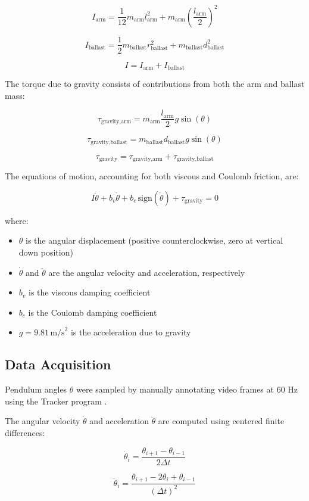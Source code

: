 \[
I_{\text{arm}} = \frac{1}{12} m_{\text{arm}} l_{\text{arm}}^2 + m_{\text{arm}} \left(\frac{l_{\text{arm}}}{2}\right)^2
\]

\[
I_{\text{ballast}} = \frac{1}{2} m_{\text{ballast}} r_{\text{ballast}}^2 + m_{\text{ballast}} d_{\text{ballast}}^2
\]

\[
I = I_{\text{arm}} + I_{\text{ballast}}
\]

The torque due to gravity consists of contributions from both the arm and ballast mass:

\[
\tau_{\text{gravity,arm}} = m_{\text{arm}} \frac{l_{\text{arm}}}{2} g \sin(\theta)
\]

\[
\tau_{\text{gravity,ballast}} = m_{\text{ballast}} d_{\text{ballast}} g \sin(\theta)
\]

\[
\tau_{\text{gravity}} = \tau_{\text{gravity,arm}} + \tau_{\text{gravity,ballast}}
\]

The equations of motion, accounting for both viscous and Coulomb friction, are:

\[
I \ddot{\theta} + b_v \dot{\theta} + b_c \, \text{sign}(\dot{\theta}) + \tau_{\text{gravity}} = 0
\]

where:
\begin{itemize}
    \item \( \theta \) is the angular displacement (positive counterclockwise, zero at vertical down position)
    \item \( \dot{\theta} \) and \( \ddot{\theta} \) are the angular velocity and acceleration, respectively
    \item \( b_v \) is the viscous damping coefficient
    \item \( b_c \) is the Coulomb damping coefficient
    \item \( g = 9.81 \, \text{m/s}^2 \) is the acceleration due to gravity
\end{itemize}

\subsection{Data Acquisition}
Pendulum angles \(\theta\) were sampled by manually annotating video frames at 60 Hz using the Tracker program \cite{tracker}. 

The angular velocity \(\dot{\theta}\) and acceleration \(\ddot{\theta}\) are computed using centered finite differences:

\[
\dot{\theta}_i = \frac{\theta_{i+1} - \theta_{i-1}}{2\Delta t}
\]

\[
\ddot{\theta}_i = \frac{\theta_{i+1} - 2\theta_i + \theta_{i-1}}{(\Delta t)^2}
\]

